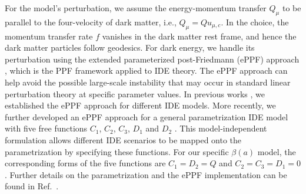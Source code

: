 \documentclass[a4paper,11pt]{article}
\begin{document}
For the model's perturbation, we assume the energy-momentum transfer $Q_\mu$ to be parallel to the four-velocity of dark matter, i.e., $Q_\mu=Qu_{\mu,c}$. In the choice, the momentum transfer rate $f$ vanishes in the dark matter rest frame, and hence the dark matter particles follow geodesics. For dark energy, we handle its perturbation using the extended parameterized post-Friedmann (ePPF) approach \cite{Li:2014eha}, which is the PPF framework \cite{Hu:2008zd,Fang:2008sn} applied to IDE theory. The ePPF approach can help avoid the possible large-scale instability \cite{Valiviita:2008iv,He:2008si,Clemson:2011an} that may occur in standard linear perturbation theory at specific parameter values. In previous works \cite{Li:2014eha,Li:2014cee}, we established the ePPF approach for different IDE models. More recently, we further developed an ePPF approach for a general parametrization IDE model with five free functions $C_1$, $C_2$, $C_3$, $D_1$ and $D_2$ \cite{Li:2023fdk}. This model-independent formulation allows different IDE scenarios to be mapped onto the parametrization by specifying these functions. For our specific $\beta(a)$ model, the corresponding forms of the five functions are $C_1=D_2=Q$ and $C_2=C_3=D_1=0$. Further details on the parametrization and the ePPF implementation can be found in Ref.~\cite{Li:2023fdk}.
\end{document}
